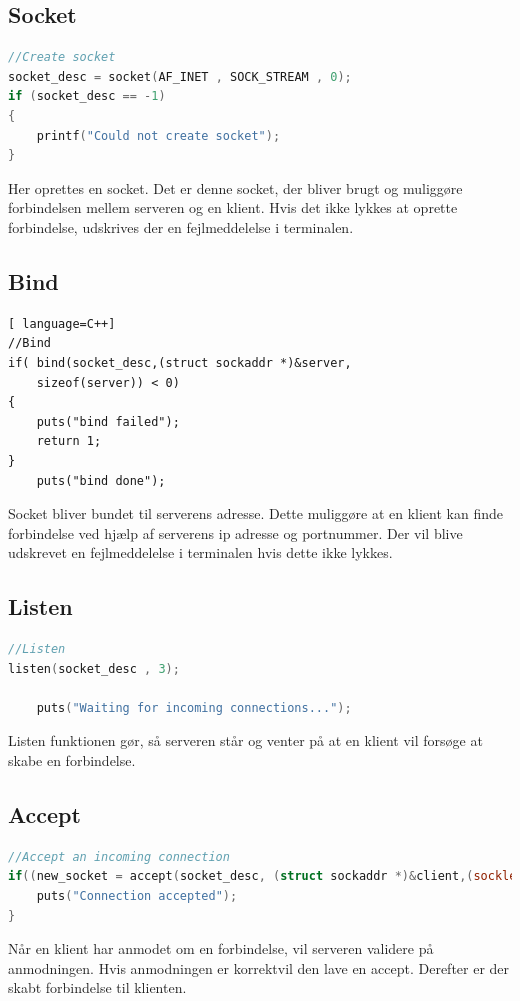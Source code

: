 \documentclass[12pt,fleqn,a4paper]{report}
\begin{document}
\subsection{Socket}
\begin{framed}
\begin{lstlisting}[language=C++]
//Create socket
socket_desc = socket(AF_INET , SOCK_STREAM , 0);
if (socket_desc == -1)
{
	printf("Could not create socket");
}
\end{lstlisting}
\end{framed}
Her oprettes en socket. Det er denne socket, der bliver brugt og muliggøre forbindelsen mellem serveren og en klient. Hvis det ikke lykkes at oprette forbindelse, udskrives der en fejlmeddelelse i terminalen. 
\newpage
\subsection{Bind}
\begin{framed}
\begin{lstlisting}[ language=C++]
//Bind
if( bind(socket_desc,(struct sockaddr *)&server,
	sizeof(server)) < 0)
{
	puts("bind failed");
	return 1;
}
	puts("bind done");
\end{lstlisting}
\end{framed}
Socket bliver bundet til serverens adresse. Dette muliggøre at en klient kan finde forbindelse ved hjælp af serverens ip adresse og portnummer. Der vil blive udskrevet en fejlmeddelelse i terminalen hvis dette ikke lykkes.

\subsection{Listen}
\begin{framed}
\begin{lstlisting}[language=C++]
//Listen
listen(socket_desc , 3);

	puts("Waiting for incoming connections...");
\end{lstlisting}
\end{framed}
Listen funktionen gør, så serveren står og venter på at en klient vil forsøge at skabe en forbindelse. 

\subsection{Accept}
\begin{framed}
\begin{lstlisting}[language=C++]
//Accept an incoming connection
if((new_socket = accept(socket_desc, (struct sockaddr *)&client,(socklen_t*)&c))){
	puts("Connection accepted");
}
\end{lstlisting}
\end{framed}
Når en klient har anmodet om en forbindelse, vil serveren validere på anmodningen. Hvis anmodningen er korrektvil den lave en accept. Derefter er der skabt forbindelse til klienten. 
\newpage
\end{document}
